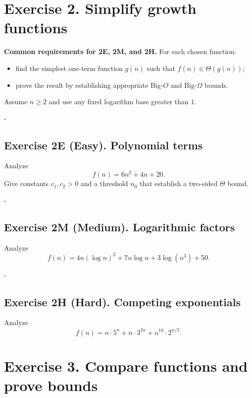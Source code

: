 \documentclass[11pt,a4paper]{article}
\makeatletter
\newcommand{\Needspace}[1]{\par\penalty-100\begingroup\setlength{\dimen@}{#1}\dimen@ii\pagegoal\advance\dimen@ii-\pagetotal\ifdim\dimen@>\dimen@ii\break\fi\endgroup}
\makeatother
\begin{document}
\section{Exercise 2. Simplify growth functions}

\begin{problembox}
\textbf{Common requirements for 2E, 2M, and 2H.}
For each chosen function:
\begin{itemize}
    \item find the simplest one-term function $g(n)$ such that
    $f(n)\in\Theta(g(n))$;
    \item prove the result by establishing appropriate Big-$O$ and
    Big-$\Omega$ bounds.
\end{itemize}
Assume $n\ge2$ and use any fixed logarithm base greater than $1$.
\end{problembox}

\Needspace{0.19\textheight}
\subsection*{Exercise 2E (Easy). Polynomial terms}

\begin{problembox}
Analyze
\[
    f(n)=6n^2+4n+20.
\]
Give constants $c_1,c_2>0$ and a threshold $n_0$ that establish a two-sided
$\Theta$ bound.
\end{problembox}

\Needspace{0.19\textheight}
\subsection*{Exercise 2M (Medium). Logarithmic factors}

\begin{problembox}
Analyze
\[
    f(n)=4n(\log n)^2+7n\log n+3\log(n^3)+50.
\]
\end{problembox}

\Needspace{0.20\textheight}
\subsection*{Exercise 2H (Hard). Competing exponentials}

\begin{problembox}
Analyze
\[
    f(n)=n\cdot5^n+n\cdot3^{2n}+n^{10}\cdot2^{n/2}.
\]
\end{problembox}

\section{Exercise 3. Compare functions and prove bounds}
\end{document}
